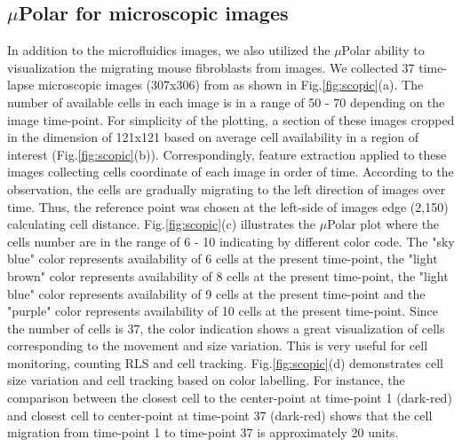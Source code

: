 \documentclass[conference]{IEEEtran}
\begin{document}
\subsection{$\mu$Polar for microscopic images}

In addition to the microfluidics images, we also utilized the $\mu$Polar ability to visualization the migrating mouse fibroblasts from images. We collected 37 time-lapse microscopic images (307x306) from \cite{ref05} as shown in Fig.\ref{fig:scopic}(a). The number of available cells in each image is in a range of 50 - 70 depending on the image time-point. For simplicity of the plotting, a section of these images cropped in the dimension of 121x121 based on average cell availability in a region of interest (Fig.\ref{fig:scopic}(b)). Correspondingly, feature extraction applied to these images collecting cells coordinate of each image in order of time. According to the observation, the cells are gradually migrating to the left direction of images over time. Thus, the reference point was chosen at the left-side of images edge (2,150) calculating cell distance. Fig.\ref{fig:scopic}(c) illustrates the $\mu$Polar plot where the cells number are in the range of 6 - 10 indicating by different color code. The "sky blue" color represents availability of 6 cells at the present time-point, the "light brown" color represents availability of 8 cells at the present time-point, the "light blue" color represents availability of 9 cells at the present time-point and the "purple" color represents availability of 10 cells at the present time-point. Since the number of cells is 37, the color indication shows a great visualization of cells corresponding to the movement and size variation. This is very useful for cell monitoring, counting RLS and cell tracking. Fig.\ref{fig:scopic}(d) demonstrates cell size variation and cell tracking based on color labelling. For instance, the comparison between the closest cell to the center-point at time-point 1 (dark-red) and closest cell to center-point at time-point 37 (dark-red) shows that the cell migration from time-point 1 to time-point 37 is approximately 20 units.       
\end{document}
